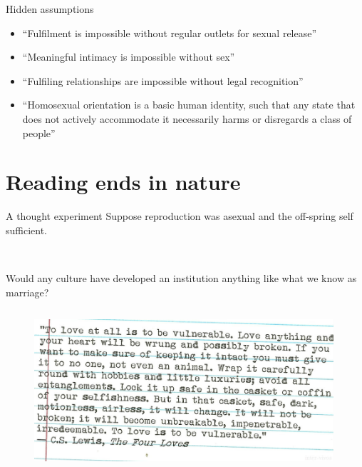 \documentclass[xcolor=dvipsnames]{beamer}
\begin{document}
\begin{frame}{Hidden assumptions}
\begin{itemize}
\item ``Fulfilment is impossible without regular outlets for sexual release''\vspace{5mm}
\item ``Meaningful intimacy is impossible without sex''\vspace{5mm}
\item ``Fulfiling relationships are impossible without legal recognition''\vspace{5mm}
\item ``Homosexual orientation is a basic human identity, such that any state that does not actively accommodate it necessarily harms or disregards a  class of people''\vspace{5mm}
\end{itemize}
\end{frame}


\section{Reading ends in nature}


\begin{frame}{A thought experiment}
\textbf{}\newline
Suppose reproduction was asexual and the off-spring self sufficient.

~

Would any culture have developed an institution anything like what we know as marriage? \vspace{10mm}
\end{frame}


\begin{frame}[plain]
  \begin{columns}[T] %
    \begin{column}{0.99\textwidth}
      \begin{figure}[H]
        \centering
        \includegraphics[width=0.99\textwidth]{cs-lewis}
      \end{figure}
    \end{column}%
  \end{columns}
\end{frame}
\end{document}
